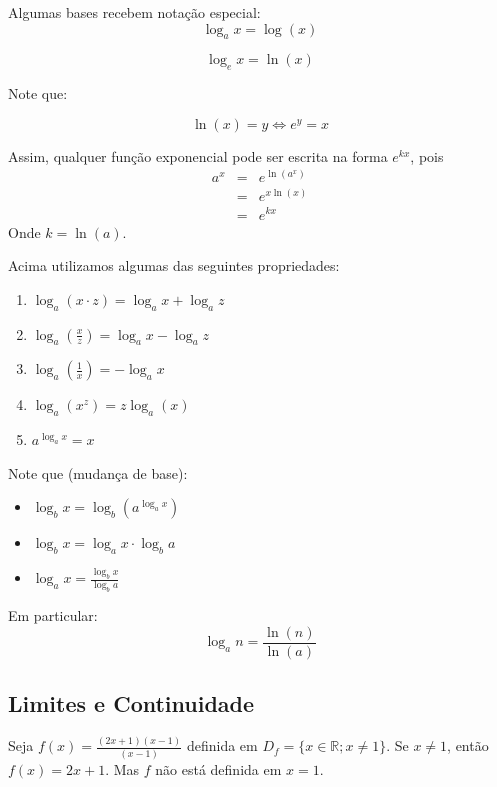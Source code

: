 \documentclass[oneside,a4paper,12pt]{article}
\begin{document}
Algumas bases recebem notação especial:
$$\log_{a}x = \log(x)$$

$$\log_{e}x = \ln(x)$$

Note que:

$$\ln(x) = y \Leftrightarrow e^{y} = x$$

Assim, qualquer função exponencial pode ser escrita na forma $e^{kx}$, pois
\begin{eqnarray*}
a^{x}	&=& e^{\ln(a^{x})}\\
		&=& e^{x \ln(x)}\\
		&=& e^{kx}
\end{eqnarray*}
Onde $k = \ln(a)$.

Acima utilizamos algumas das seguintes propriedades:
\begin{enumerate}
	\item $\log_{a}(x \cdot z) = \log_{a}x + \log_{a}z$
	\item $\log_{a}(\frac{x}{z}) = \log_{a}x - \log_{a}z$
	\item $\log_{a}(\frac{1}{x}) = - \log_{a}x$
	\item $\log_{a}(x^{z}) = z \log_{a}(x)$
	\item $a^{\log_{a}x} = x$
\end{enumerate}

Note que (mudança de base):
\begin{itemize}
	\item $\log_{b}x = \log_{b}(a^{\log_{a}x})$
	\item $\log_{b}x = \log_{a}x \cdot \log_{b}a$
	\item $\log_{a}x = \frac{\log_{b}x}{\log_{b}a}$
\end{itemize}

Em particular:
$$\log_{a}n = \frac{\ln(n)}{\ln(a)}$$


\newpage
\begin{snugshade}
	\section{Limites e Continuidade}
\end{snugshade}	

Seja $f(x) = \frac{(2x+1)(x-1)}{(x-1)}$ definida em $D_{f} = \{ x \in \mathbb{R}; x \neq 1 \}$. Se $x \neq 1$, então $f(x) = 2x+1$. Mas $f$ não está definida em $x=1$.
\end{document}
